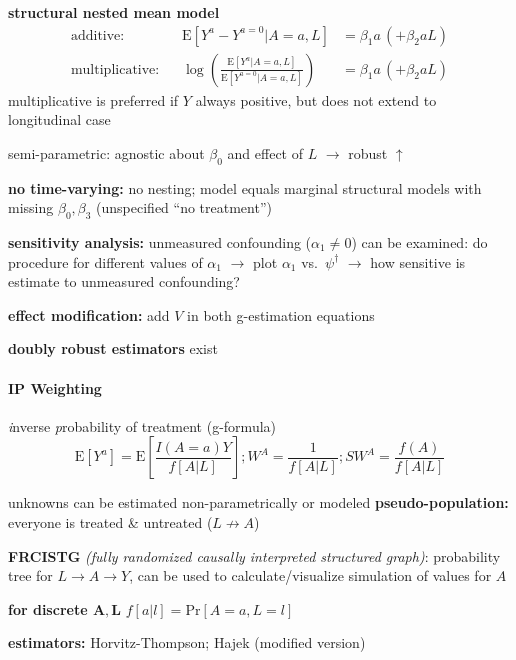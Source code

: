 \documentclass[8pt,oneside]{extarticle}
\begin{document}
\begin{multicols}{2}
\noindent \textbf{structural nested mean model}
\begin{align*}
\text{additive: }\,\,\, & \mathrm{E}\left[Y^a-Y^{a=0}|A=a, L\right] &= \beta_1 a \,(+ \beta_2 a L) \\
\text{multiplicative: }\,\,\, & \log \left( \frac{\mathrm{E}\left[Y^a|A=a, L\right]}{\mathrm{E}\left[Y^{a=0}|A=a, L\right]} \right) &= \beta_1 a \,(+ \beta_2 a L)
\end{align*} 
multiplicative is preferred if $Y$ always positive, but does not extend to longitudinal case

\noindent semi-parametric: agnostic about $\beta_0$ and effect of $L$ $\rightarrow$ robust $\uparrow$

\noindent \textbf{no time-varying:} no nesting; model equals marginal structural models with missing $\beta_0, \beta_3$ (unspecified ``no treatment'')

\noindent \textbf{sensitivity analysis:} unmeasured confounding ($\alpha_1 \neq 0$) can be examined: do procedure  for different values of $\alpha_1$ $\rightarrow$ plot $\alpha_1$ vs.\ $\psi^\dagger$ $\rightarrow$ how sensitive is  estimate to unmeasured confounding?

\noindent \textbf{effect modification:} add $V$ in both g-estimation equations %


\noindent \textbf{doubly robust estimators} exist%


\paragraph{\large IP Weighting} \textit{i}nverse \textit{p}robability of treatment (g-formula)
$$\mathrm{E}\left[Y^{a}\right] = \mathrm{E}\left[\frac{I(A=a)Y}{f\left[A|L\right]}\right]; W^A=\frac{1}{f\left[A|L\right]}; SW^A = \frac{f(A)}{f\left[A|L\right]}$$

\noindent unknowns can be estimated non-parametrically or modeled
\noindent \textbf{pseudo-population:} everyone is treated \& untreated ($L\not\to A$)

\noindent \textbf{FRCISTG} \textit{(fully randomized causally interpreted structured graph)}: probability tree for $L \rightarrow A \rightarrow Y$, can be used to calculate/visualize simulation of values for $A$ 

\noindent \textbf{for discrete $\boldsymbol{A, L}$} $f\left[a|l\right] = \mathrm{Pr}\left[A=a,L=l\right]$

\noindent \textbf{estimators:} Horvitz-Thompson; Hajek (modified version) %


\end{multicols}
\end{document}
